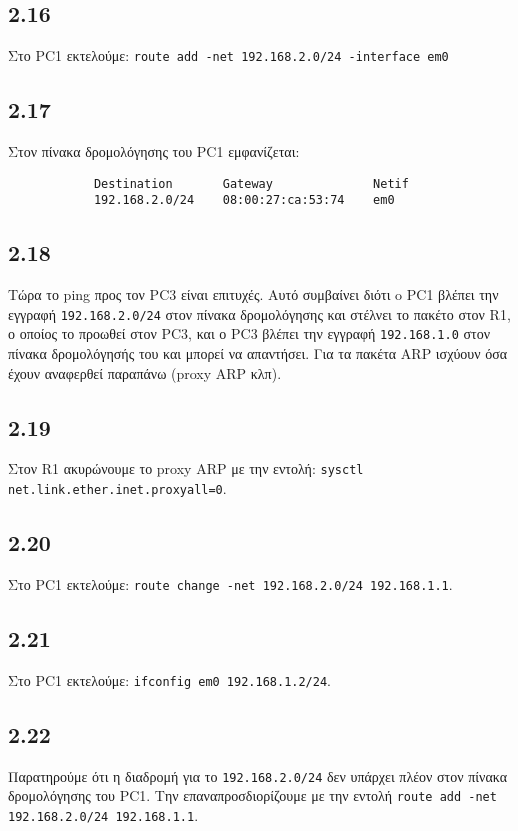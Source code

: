 \documentclass[a4paper, 12pt]{article}
\begin{document}
	\subsection*{2.16}
		Στο PC1 εκτελούμε: \verb|route add -net 192.168.2.0/24 -interface em0|

	\subsection*{2.17}
		Στον πίνακα δρομολόγησης του PC1 εμφανίζεται:
		
		\begin{verbatim}
			Destination       Gateway              Netif
			192.168.2.0/24    08:00:27:ca:53:74    em0
		\end{verbatim}

	\subsection*{2.18}
		Τώρα το ping προς τον PC3 είναι επιτυχές. Αυτό συμβαίνει διότι o PC1 βλέπει την εγγραφή \verb|192.168.2.0/24| στον πίνακα δρομολόγησης και στέλνει το πακέτο στον R1, ο οποίος το προωθεί στον PC3, και ο PC3 βλέπει την εγγραφή \verb|192.168.1.0| στον πίνακα δρομολόγησής του και μπορεί να απαντήσει. Για τα πακέτα ARP ισχύουν όσα έχουν αναφερθεί παραπάνω (proxy ARP κλπ).

	\subsection*{2.19}
		Στον R1 ακυρώνουμε το proxy ARP με την εντολή: \verb|sysctl net.link.ether.inet.proxyall=0|.

	\subsection*{2.20}
		Στο PC1 εκτελούμε: \verb|route change -net 192.168.2.0/24 192.168.1.1|.

	\subsection*{2.21}
		Στο PC1 εκτελούμε: \verb|ifconfig em0 192.168.1.2/24|.

	\subsection*{2.22} 
		Παρατηρούμε ότι η διαδρομή για το \verb|192.168.2.0/24| δεν υπάρχει πλέον στον πίνακα δρομολόγησης του PC1. Την επαναπροσδιορίζουμε με την εντολή \verb|route add -net 192.168.2.0/24 192.168.1.1|.
\end{document}
